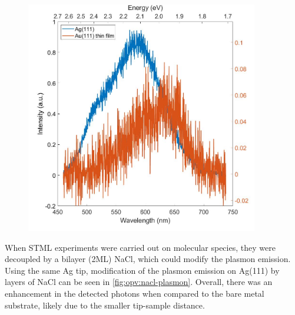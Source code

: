 
\begin{figure} [h]
    \centering
    \includegraphics[width=4in]{pictures/Ag_Au_plasmon_3V_200pA_10s.jpg}
    \caption{}
    \label{fig:opv:metal-plasmon}
\end{figure}



When \ac{STML} experiments were carried out on molecular species, they were decoupled by a bilayer (2\ac{ML}) NaCl, which could modify the plasmon emission. Using the same Ag tip, modification of the plasmon emission on Ag(111) by layers of NaCl can be seen in \autoref{fig:opv:nacl-plasmon}. Overall, there was an enhancement in the detected photons when compared to the bare metal substrate, likely due to the smaller tip-sample distance.


